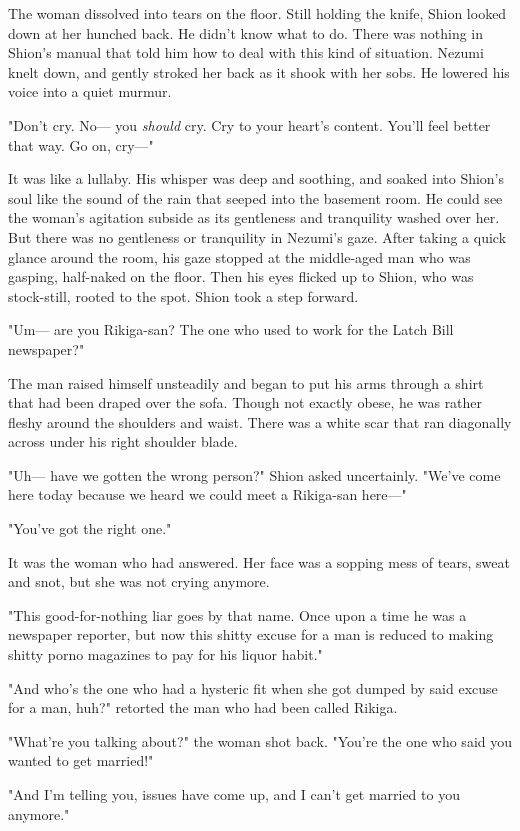 The woman dissolved into tears on the floor. Still holding the knife,
Shion looked down at her hunched back. He didn't know what to do. There
was nothing in Shion's manual that told him how to deal with this kind
of situation. Nezumi knelt down, and gently stroked her back as it shook
with her sobs. He lowered his voice into a quiet murmur.

"Don't cry. No--- you \emph{should} cry. Cry to your heart's content. You'll feel
better that way. Go on, cry---"

It was like a lullaby. His whisper was deep and soothing, and soaked
into Shion's soul like the sound of the rain that seeped into the
basement room. He could see the woman's agitation subside as its
gentleness and tranquility washed over her. But there was no gentleness
or tranquility in Nezumi's gaze. After taking a quick glance around the
room, his gaze stopped at the middle-aged man who was gasping,
half-naked on the floor. Then his eyes flicked up to Shion, who was
stock-still, rooted to the spot. Shion took a step forward.

"Um--- are you Rikiga-san? The one who used to work for the Latch Bill
newspaper?"

The man raised himself unsteadily and began to put his arms through a
shirt that had been draped over the sofa. Though not exactly obese, he
was rather fleshy around the shoulders and waist. There was a white scar
that ran diagonally across under his right shoulder blade.

"Uh--- have we gotten the wrong person?" Shion asked uncertainly. "We've
come here today because we heard we could meet a Rikiga-san here---"

"You've got the right one."

It was the woman who had answered. Her face was a sopping mess of tears,
sweat and snot, but she was not crying anymore.

"This good-for-nothing liar goes by that name. Once upon a time he was a
newspaper reporter, but now this shitty excuse for a man is reduced to
making shitty porno magazines to pay for his liquor habit."

"And who's the one who had a hysteric fit when she got dumped by said
excuse for a man, huh?" retorted the man who had been called Rikiga.

"What're you talking about?" the woman shot back. "You're the one who
said you wanted to get married!"

"And I'm telling you, issues have come up, and I can't get married to
you anymore."

